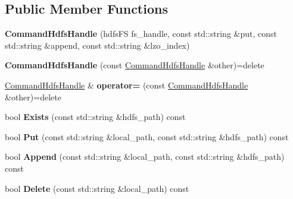 \subsection*{Public Member Functions}
\begin{DoxyCompactItemize}
\item 
{\bfseries Command\+Hdfs\+Handle} (hdfs\+FS fs\+\_\+handle, const std\+::string \&put, const std\+::string \&append, const std\+::string \&lzo\+\_\+index)\hypertarget{classlog2hdfs_1_1CommandHdfsHandle_a6cc703cfb412a5b8d595cb5308d0af73}{}\label{classlog2hdfs_1_1CommandHdfsHandle_a6cc703cfb412a5b8d595cb5308d0af73}

\item 
{\bfseries Command\+Hdfs\+Handle} (const \hyperlink{classlog2hdfs_1_1CommandHdfsHandle}{Command\+Hdfs\+Handle} \&other)=delete\hypertarget{classlog2hdfs_1_1CommandHdfsHandle_a2ebf3179a88faa584f441abd4e009497}{}\label{classlog2hdfs_1_1CommandHdfsHandle_a2ebf3179a88faa584f441abd4e009497}

\item 
\hyperlink{classlog2hdfs_1_1CommandHdfsHandle}{Command\+Hdfs\+Handle} \& {\bfseries operator=} (const \hyperlink{classlog2hdfs_1_1CommandHdfsHandle}{Command\+Hdfs\+Handle} \&other)=delete\hypertarget{classlog2hdfs_1_1CommandHdfsHandle_a22fbe0c5f363e8eba51b1bec46880c41}{}\label{classlog2hdfs_1_1CommandHdfsHandle_a22fbe0c5f363e8eba51b1bec46880c41}

\item 
bool {\bfseries Exists} (const std\+::string \&hdfs\+\_\+path) const \hypertarget{classlog2hdfs_1_1CommandHdfsHandle_aedd6e77ec370ee8d70eb4abd866650e8}{}\label{classlog2hdfs_1_1CommandHdfsHandle_aedd6e77ec370ee8d70eb4abd866650e8}

\item 
bool {\bfseries Put} (const std\+::string \&local\+\_\+path, const std\+::string \&hdfs\+\_\+path) const \hypertarget{classlog2hdfs_1_1CommandHdfsHandle_adf2d5e74962f6fd66a394b4494c32c72}{}\label{classlog2hdfs_1_1CommandHdfsHandle_adf2d5e74962f6fd66a394b4494c32c72}

\item 
bool {\bfseries Append} (const std\+::string \&local\+\_\+path, const std\+::string \&hdfs\+\_\+path) const \hypertarget{classlog2hdfs_1_1CommandHdfsHandle_a39af81a2d01df38e36efcdf2684d601a}{}\label{classlog2hdfs_1_1CommandHdfsHandle_a39af81a2d01df38e36efcdf2684d601a}

\item 
bool {\bfseries Delete} (const std\+::string \&local\+\_\+path) const \hypertarget{classlog2hdfs_1_1CommandHdfsHandle_a0981dd22da8c6dd1561e3180590a4d02}{}\label{classlog2hdfs_1_1CommandHdfsHandle_a0981dd22da8c6dd1561e3180590a4d02}


\end{DoxyCompactItemize}
